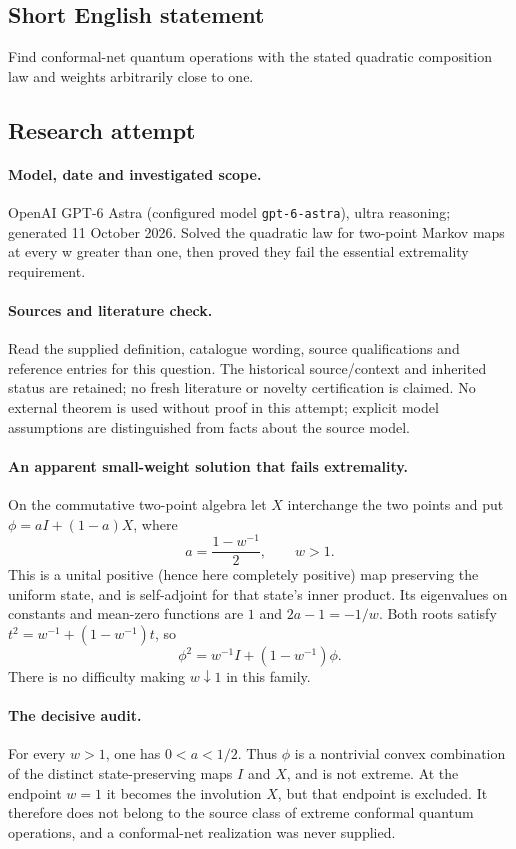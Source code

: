 \documentclass[11pt]{article}
\begin{document}
\subsection{Short English statement}
Find conformal-net quantum operations with the stated quadratic composition law and weights arbitrarily close to one.
\subsection{Research attempt}
\paragraph{Model, date and investigated scope.}
OpenAI GPT-6 Astra (configured model \texttt{gpt-6-astra}), ultra reasoning; generated 11 October 2026. Solved the quadratic law for two-point Markov maps at every w greater than one, then proved they fail the essential extremality requirement.

\paragraph{Sources and literature check.}
Read the supplied definition, catalogue wording, source qualifications and reference entries for this question. The historical source/context and inherited status are retained; no fresh literature or novelty certification is claimed. No external theorem is used without proof in this attempt; explicit model assumptions are distinguished from facts about the source model.

\paragraph{An apparent small-weight solution that fails extremality.} On the commutative two-point algebra let \(X\) interchange the two points and put \(\phi=aI+(1-a)X\), where
\[
 a=\frac{1-w^{-1}}2,\qquad w>1.
\]
This is a unital positive (hence here completely positive) map preserving the uniform state, and is self-adjoint for that state's inner product. Its eigenvalues on constants and mean-zero functions are \(1\) and \(2a-1=-1/w\). Both roots satisfy \(t^2=w^{-1}+(1-w^{-1})t\), so
\[
 \phi^2=w^{-1}I+(1-w^{-1})\phi.
\]
There is no difficulty making \(w\downarrow1\) in this family.
\paragraph{The decisive audit.} For every \(w>1\), one has \(0<a<1/2\). Thus \(\phi\) is a nontrivial convex combination of the distinct state-preserving maps \(I\) and \(X\), and is not extreme. At the endpoint \(w=1\) it becomes the involution \(X\), but that endpoint is excluded. It therefore does not belong to the source class of extreme conformal quantum operations, and a conformal-net realization was never supplied.
\end{document}
